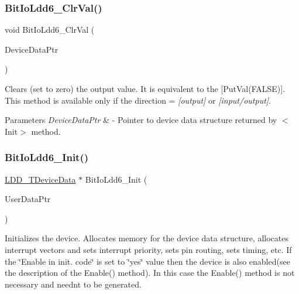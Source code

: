 \subsubsection{\texorpdfstring{Bit\+Io\+Ldd6\+\_\+\+Clr\+Val()}{BitIoLdd6\_ClrVal()}}
{\footnotesize\ttfamily void Bit\+Io\+Ldd6\+\_\+\+Clr\+Val (\begin{DoxyParamCaption}\item[{\hyperlink{group___p_e___types__module_gac5cf1362f1f0e3a2ce71b1bf2276d091}{L\+D\+D\+\_\+\+T\+Device\+Data} $\ast$}]{Device\+Data\+Ptr }\end{DoxyParamCaption})}



Clears (set to zero) the output value. It is equivalent to the \mbox{[}Put\+Val(\+F\+A\+L\+S\+E)\mbox{]}. This method is available only if the direction = {\itshape \mbox{[}output\mbox{]}} or {\itshape \mbox{[}input/output\mbox{]}}. 


\begin{DoxyParams}{Parameters}
{\em Device\+Data\+Ptr} & -\/ Pointer to device data structure returned by $<$\+Init$>$ method. \\
\hline
\end{DoxyParams}
\mbox{\label{group___bit_io_ldd6__module_gaff0c7e309720dbf2e46e7ce4f96b3035}} 
\subsubsection{\texorpdfstring{Bit\+Io\+Ldd6\+\_\+\+Init()}{BitIoLdd6\_Init()}}
{\footnotesize\ttfamily \hyperlink{group___p_e___types__module_gac5cf1362f1f0e3a2ce71b1bf2276d091}{L\+D\+D\+\_\+\+T\+Device\+Data} $\ast$ Bit\+Io\+Ldd6\+\_\+\+Init (\begin{DoxyParamCaption}\item[{\hyperlink{group___p_e___types__module_ga0b66a73f87238a782318aa0be7578e35}{L\+D\+D\+\_\+\+T\+User\+Data} $\ast$}]{User\+Data\+Ptr }\end{DoxyParamCaption})}



Initializes the device. Allocates memory for the device data structure, allocates interrupt vectors and sets interrupt priority, sets pin routing, sets timing, etc. If the \char`\"{}\+Enable
    in init. code\char`\"{} is set to \char`\"{}yes\char`\"{} value then the device is also enabled(see the description of the Enable() method). In this case the Enable() method is not necessary and needn\textquotesingle{}t to be generated. 


